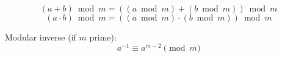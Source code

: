 \[
(a+b) \bmod m = ((a \bmod m) + (b \bmod m)) \bmod m
\]
\[
(a \cdot b) \bmod m = ((a \bmod m) \cdot (b \bmod m)) \bmod m
\]

Modular inverse (if $m$ prime):
\[
a^{-1} \equiv a^{m-2} \pmod{m}
\]